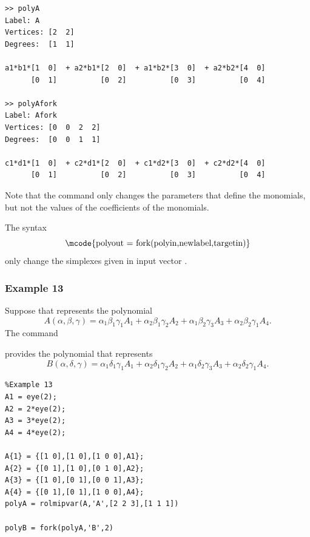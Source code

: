 \documentclass[english,11pt]{article}
\theoremstyle{break} \theorembodyfont{\small\rm}
\begin{document}
\begin{minipage}{14.5cm}
\begin{lstlisting}[rulecolor=\color{red}]
>> polyA
Label: A
Vertices: [2  2]
Degrees:  [1  1]
 
a1*b1*[1  0]  + a2*b1*[2  0]  + a1*b2*[3  0]  + a2*b2*[4  0] 
      [0  1]          [0  2]          [0  3]          [0  4]

>> polyAfork
Label: Afork
Vertices: [0  0  2  2]
Degrees:  [0  0  1  1]
 
c1*d1*[1  0]  + c2*d1*[2  0]  + c1*d2*[3  0]  + c2*d2*[4  0] 
      [0  1]          [0  2]          [0  3]          [0  4]
\end{lstlisting}
\end{minipage}
\vspace{0.2cm}


Note that the command  only changes the parameters that define the monomials, but not the 
values of the coefficients of the monomials. 

The syntax
\[
\mbox{\mcode{polyout = fork(polyin,newlabel,targetin)}}
\]
only change the simplexes given in input vector .

\subsubsection*{Example 13}
Suppose that  represents the polynomial
\[
 A(\alpha,\beta,\gamma) = \alpha_1 \beta_1 \gamma_1 A_1 + \alpha_2 \beta_1 \gamma_2 A_2  + \alpha_1 \beta_2 \gamma_3 A_3 + \alpha_2 \beta_2 \gamma_1 A_4.
\]
The command

\vspace{0.5cm}%
\begin{minipage}{8.5cm}
\end{minipage}
\vspace{0.2cm}

provides the polynomial 
that represents
\[
 B(\alpha,\delta,\gamma) = \alpha_1 \delta_1 \gamma_1 A_1 + \alpha_2 \delta_1 \gamma_2 A_2  + \alpha_1 \delta_2 \gamma_3 A_3 + \alpha_2 \delta_2 \gamma_1 A_4.
\]

\begin{minipage}{9.5cm}
 \begin{lstlisting}
%Example 13
A1 = eye(2);
A2 = 2*eye(2);
A3 = 3*eye(2);
A4 = 4*eye(2);

A{1} = {[1 0],[1 0],[1 0 0],A1};
A{2} = {[0 1],[1 0],[0 1 0],A2};
A{3} = {[1 0],[0 1],[0 0 1],A3};
A{4} = {[0 1],[0 1],[1 0 0],A4};
polyA = rolmipvar(A,'A',[2 2 3],[1 1 1])

polyB = fork(polyA,'B',2)
 \end{lstlisting}
\end{minipage}
\vspace{0.2cm}
\end{document}

